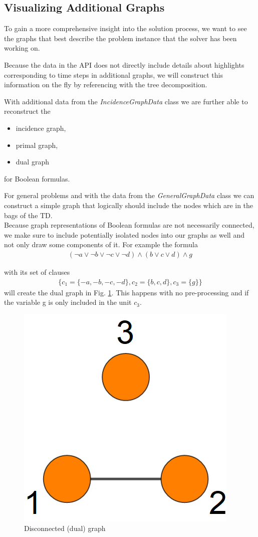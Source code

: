 \documentclass[a4paper, 12pt, bibliography=totoc]{scrartcl}
\begin{document}
\subsection{Visualizing Additional Graphs}
To gain a more comprehensive insight into the solution process, we want to see the graphs that best describe the problem instance that the solver has been working on.

Because the data in the API does not directly include details about highlights corresponding to time steps in additional graphs, we will construct this information on the fly by referencing with the tree decomposition.

\pagebreak
With additional data from the \textit{IncidenceGraphData} class we are further able to reconstruct the
\begin{itemize}
	\item incidence graph,
	\item primal graph,
	\item dual graph
\end{itemize}
for Boolean formulas.

For general problems and with the data from the \textit{GeneralGraphData} class we can construct a simple graph that logically should include the nodes which are in the bags of the TD.\\
Because graph representations of Boolean formulas are not necessarily connected, we make sure to include potentially isolated nodes into our graphs as well and not only draw some components of it.
For example the formula 
\begin{gather*}
(\neg a\lor \neg b\lor \neg c\lor \neg d)\land (b\lor c\lor d)\land g
\end{gather*}

with its set of clauses 
\begin{gather*}\{c_{1}=\{-a,-b,-c,-d\},c_{2}=\{b,c,d\},c_{3}=\{g\}\}\end{gather*}
will create the dual graph in Fig. \ref{fig:disconnected123}. This happens with no pre-processing and if the variable g is only included in the unit $c_{3}$.

\begin{figure}[H]
	\centering
	\includegraphics[width=0.3\linewidth]{images/disconnected123.png}
	\caption{Disconnected (dual) graph}
	\label{fig:disconnected123}
\end{figure}
\end{document}
